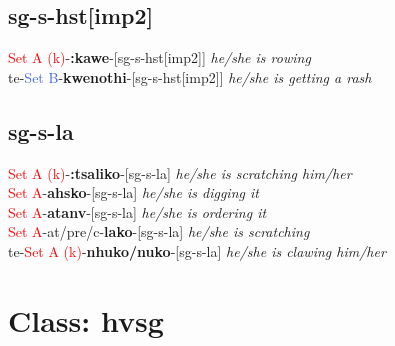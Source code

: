 \documentclass[oneside,openany]{book}%
\begin{document}
\subsection*{sg-s-hst[imp2]}%
\textcolor{Red}{Set A (k)}{-}\textbf{:kawe}{-}[sg-s-hst[imp2]] \textit{ he/she is rowing} \\%
te{-}\textcolor{RoyalBlue}{Set B}{-}\textbf{kwenothi}{-}[sg-s-hst[imp2]] \textit{ he/she is getting a rash} \\%
\vspace{1em}%
\needspace{1in}%
\subsection*{sg-s-la}%
\textcolor{Red}{Set A (k)}{-}\textbf{:tsaliko}{-}[sg-s-la] \textit{ he/she is scratching him/her} \\%
\textcolor{Red}{Set A}{-}\textbf{ahsko}{-}[sg-s-la] \textit{ he/she is digging it} \\%
\textcolor{Red}{Set A}{-}\textbf{atanv}{-}[sg-s-la] \textit{ he/she is ordering it} \\%
\textcolor{Red}{Set A}{-}at/pre/c{-}\textbf{lako}{-}[sg-s-la] \textit{ he/she is scratching} \\%
te{-}\textcolor{Red}{Set A (k)}{-}\textbf{nhuko/nuko}{-}[sg-s-la] \textit{ he/she is clawing him/her} \\%
\vspace{1em}%
\needspace{3in}%
\section*{Class: hvsg}%
%
\needspace{1in}%
\end{document}
